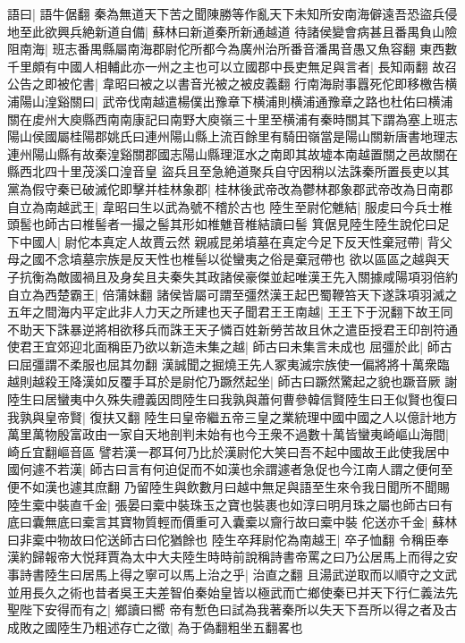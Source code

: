 語曰|{
	語牛倨翻}
秦為無道天下苦之聞陳勝等作亂天下未知所安南海僻遠吾恐盜兵侵地至此欲興兵絶新道自備|{
	蘇林曰新道秦所新通越道}
待諸侯變會病甚且番禺負山險阻南海|{
	班志番禺縣屬南海郡尉佗所都今為廣州治所番音潘禺音愚又魚容翻}
東西數千里頗有中國人相輔此亦一州之主也可以立國郡中長吏無足與言者|{
	長知兩翻}
故召公告之即被佗書|{
	韋昭曰被之以書音光被之被皮義翻}
行南海尉事囂死佗即移檄告横浦陽山湟谿關曰|{
	武帝伐南越遣楊僕出豫章下横浦則横浦通豫章之路也杜佑曰横浦關在䖍州大庾縣西南南康記曰南野大庾嶺三十里至横浦有秦時關其下謂為塞上班志陽山侯國屬桂陽郡姚氏曰連州陽山縣上流百餘里有騎田嶺當是陽山關新唐書地理志連州陽山縣有故秦湟谿關郡國志陽山縣理洭水之南即其故墟本南越置關之邑故關在縣西北四十里茂溪口湟音皇}
盜兵且至急絶道聚兵自守因稍以法誅秦所置長吏以其黨為假守秦已破滅佗即擊并桂林象郡|{
	桂林後武帝改為鬱林郡象郡武帝改為日南郡}
自立為南越武王|{
	韋昭曰生以武為號不稽於古也}
陸生至尉佗魋結|{
	服䖍曰今兵士椎頭䯻也師古曰椎髻者一撮之髻其形如椎魋音椎結讀曰髻}
箕倨見陸生陸生說佗曰足下中國人|{
	尉佗本真定人故賈云然}
親戚昆弟墳墓在真定今足下反天性棄冠帶|{
	背父母之國不念墳墓宗族是反天性也椎髻以從蠻夷之俗是棄冠帶也}
欲以區區之越與天子抗衡為敵國禍且及身矣且夫秦失其政諸侯豪傑並起唯漢王先入關據咸陽項羽倍約自立為西楚霸王|{
	倍蒲妹翻}
諸侯皆屬可謂至彊然漢王起巴蜀鞭笞天下遂誅項羽滅之五年之間海内平定此非人力天之所建也天子聞君王王南越|{
	王王下于況翻下故王同}
不助天下誅暴逆將相欲移兵而誅王天子憐百姓新勞苦故且休之遣臣授君王印剖符通使君王宜郊迎北面稱臣乃欲以新造未集之越|{
	師古曰未集言未成也}
屈彊於此|{
	師古曰屈彊謂不柔服也屈其勿翻}
漢誠聞之掘燒王先人冢夷滅宗族使一偏將將十萬衆臨越則越殺王降漢如反覆手耳於是尉佗乃蹶然起坐|{
	師古曰蹶然驚起之貌也蹶音厥}
謝陸生曰居蠻夷中久殊失禮義因問陸生曰我孰與蕭何曹參韓信賢陸生曰王似賢也復曰我孰與皇帝賢|{
	復扶又翻}
陸生曰皇帝繼五帝三皇之業統理中國中國之人以億計地方萬里萬物殷富政由一家自天地剖判未始有也今王衆不過數十萬皆蠻夷崎嶇山海間|{
	崎丘宜翻嶇音區}
譬若漢一郡耳何乃比於漢尉佗大笑曰吾不起中國故王此使我居中國何遽不若漢|{
	師古曰言有何迫促而不如漢也余謂遽者急促也今江南人謂之便何至便不如漢也遽其庶翻}
乃留陸生與飲數月曰越中無足與語至生來令我日聞所不聞賜陸生槖中裝直千金|{
	張晏曰槖中裝珠玉之寶也裝裹也如淳曰明月珠之屬也師古曰有底曰囊無底曰槖言其寶物質輕而價重可入囊槖以齎行故曰槖中裝}
佗送亦千金|{
	蘇林曰非槖中物故曰佗送師古曰佗猶餘也}
陸生卒拜尉佗為南越王|{
	卒子恤翻}
令稱臣奉漢約歸報帝大悦拜賈為太中大夫陸生時時前說稱詩書帝罵之曰乃公居馬上而得之安事詩書陸生曰居馬上得之寧可以馬上治之乎|{
	治直之翻}
且湯武逆取而以順守之文武並用長久之術也昔者吳王夫差智伯秦始皇皆以極武而亡鄉使秦已并天下行仁義法先聖陛下安得而有之|{
	鄉讀曰嚮}
帝有慙色曰試為我著秦所以失天下吾所以得之者及古成敗之國陸生乃粗述存亡之徵|{
	為于偽翻粗坐五翻畧也}

